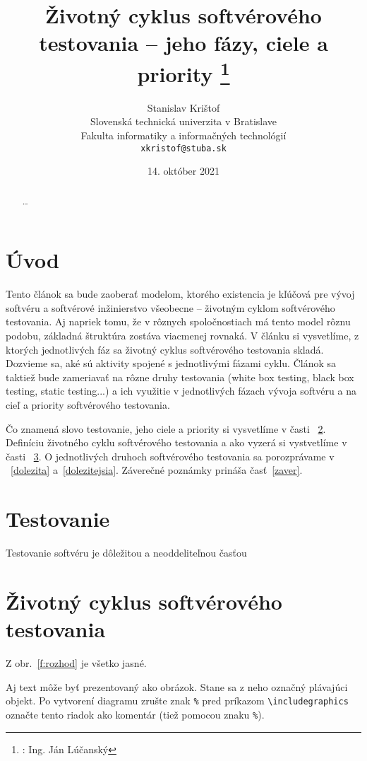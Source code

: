 \documentclass[10pt,twoside,slovak,a4paper]{article}
\title{Životný cyklus softvérového testovania – jeho fázy, ciele a priority
\thanks{: Ing. Ján Lúčanský}} %
\author{Stanislav Krištof\\[2pt]
	{\small Slovenská technická univerzita v Bratislave}\\
	{\small Fakulta informatiky a informačných technológií}\\
	{\small \texttt{xkristof@stuba.sk}}
	}
\date{\small 14. október 2021} %
\begin{document}
\maketitle
\begin{abstract}
\ldots
\end{abstract}



\section{Úvod}
Tento článok sa bude zaoberať modelom, ktorého existencia je kľúčová pre vývoj softvéru a 
softvérové inžinierstvo všeobecne – životným cyklom softvérového testovania. Aj napriek tomu, že 
v rôznych spoločnostiach má tento model rôznu podobu, základná štruktúra zostáva viacmenej 
rovnaká. V článku si vysvetlíme, z ktorých jednotlivých fáz sa životný cyklus softvérového 
testovania skladá. Dozvieme sa, aké sú aktivity spojené s jednotlivými fázami cyklu. Článok sa 
taktiež bude zameriavať na rôzne druhy testovania (white box testing, black box testing, static 
testing...) a ich využitie v jednotlivých fázach vývoja softvéru a na cieľ a priority softvérového 
testovania.

Čo znamená slovo testovanie, jeho ciele a priority si vysvetlíme v časti ~\ref{testovanie}.
Definíciu životného cyklu softvérového testovania a ako vyzerá si vystvetlíme v časti ~\ref{diagram}.
O jednotlivých druhoch softvérového testovania sa porozprávame v ~\ref{dolezita} a~\ref{dolezitejsia}.
Záverečné poznámky prináša časť~\ref{zaver}.



\section{Testovanie} \label{testovanie}

\begin{figure*}[tbh]
\centering
Testovanie softvéru je dôležitou a neoddeliteľnou časťou
\end{figure*}


\section{Životný cyklus softvérového testovania} \label{diagram}

Z obr.~\ref{f:rozhod} je všetko jasné. 

\begin{figure*}[tbh]
\centering
Aj text môže byť prezentovaný ako obrázok. Stane sa z neho označný plávajúci objekt. Po vytvorení diagramu zrušte znak \texttt{\%} pred príkazom \verb|\includegraphics| označte tento riadok ako komentár (tiež pomocou znaku \texttt{\%}).
\caption{Rozhodujúci argument.}
\label{f:rozhod}
\end{figure*}
\end{document}
